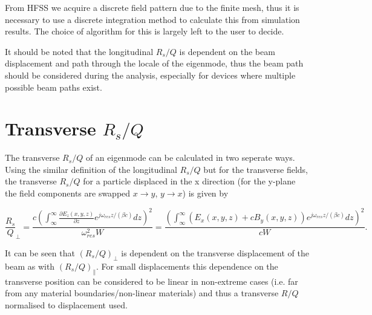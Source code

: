 From HFSS we acquire a discrete field pattern due to the finite mesh, thus it is necessary to use a discrete integration method to calculate this from simulation results. The choice of algorithm for this is largely left to the user to decide.

It should be noted that the longitudinal $R_{s}/Q$ is dependent on the beam displacement and path through the locale of the eigenmode, thus the beam path should be considered during the analysis, especially for devices where multiple possible beam paths exist.

\section{Transverse $R_{s}/Q$}

The transverse $R_{s}/Q$ of an eigenmode can be calculated in two seperate ways. Using the similar definition of the longitudinal $R_{s}/Q$ but for the transverse fields, the transverse $R_{s}/Q$ for a particle displaced in the x direction (for the y-plane the field components are swapped $x \rightarrow y$, $y \rightarrow x$) is given by \cite{Grudiev:LongTransSecCol}

\begin{equation}
\frac{R_{s}}{Q}_{\perp} = \frac{c \left( \int^{\infty}_{\infty} \frac{\partial E_{z} \left( x,y,z \right)}{\partial z} e^{j \omega_{res}z/\left( \beta c \right)} dz\right)^{2}}{\omega_{res}^{2}W} = \frac{ \left( \int^{\infty}_{\infty}  \left( E_{x} \left( x,y,z \right) + c B_{y} \left( x,y,z \right) \right) e^{j \omega_{res}z/\left( \beta c \right)} dz\right)^{2}}{cW}.
\end{equation}

It can be seen that $(R_{s}/Q)_{\perp}$ is dependent on the transverse displacement of the beam as with $(R_{s}/Q)_{\parallel}$. For small displacements this dependence on the transverse position can be considered to be linear in non-extreme cases (i.e. far from any material boundaries/non-linear materials) and thus a transverse $R/Q$ normalised to displacement used.
